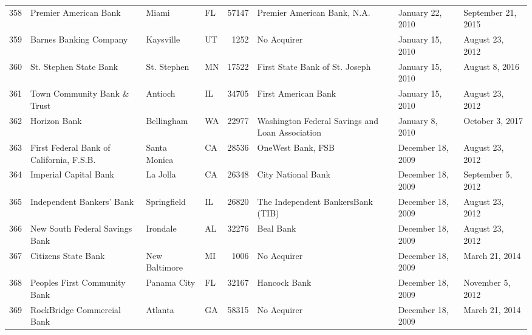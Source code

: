 \begin{tabular}{llllrlll}
358 &                              Premier American Bank &               Miami &  FL &  57147 &                        Premier American Bank, N.A. &    January 22, 2010 &  September 21, 2015 \\
359 &                             Barnes Banking Company &           Kaysville &  UT &   1252 &                                        No Acquirer &    January 15, 2010 &     August 23, 2012 \\
360 &                             St. Stephen State Bank &         St. Stephen &  MN &  17522 &                     First State Bank of St. Joseph &    January 15, 2010 &      August 8, 2016 \\
361 &                        Town Community Bank \& Trust &             Antioch &  IL &  34705 &                                First American Bank &    January 15, 2010 &     August 23, 2012 \\
362 &                                       Horizon Bank &          Bellingham &  WA &  22977 &    Washington Federal Savings and Loan Association &     January 8, 2010 &     October 3, 2017 \\
363 &           First Federal Bank of California, F.S.B. &        Santa Monica &  CA &  28536 &                                  OneWest Bank, FSB &   December 18, 2009 &     August 23, 2012 \\
364 &                              Imperial Capital Bank &            La Jolla &  CA &  26348 &                                 City National Bank &   December 18, 2009 &   September 5, 2012 \\
365 &                          Independent Bankers' Bank &         Springfield &  IL &  26820 &                  The Independent BankersBank (TIB) &   December 18, 2009 &     August 23, 2012 \\
366 &                     New South Federal Savings Bank &            Irondale &  AL &  32276 &                                          Beal Bank &   December 18, 2009 &     August 23, 2012 \\
367 &                                Citizens State Bank &       New Baltimore &  MI &   1006 &                                        No Acquirer &   December 18, 2009 &      March 21, 2014 \\
368 &                       Peoples First Community Bank &         Panama City &  FL &  32167 &                                       Hancock Bank &   December 18, 2009 &    November 5, 2012 \\
369 &                         RockBridge Commercial Bank &             Atlanta &  GA &  58315 &                                        No Acquirer &   December 18, 2009 &      March 21, 2014 \\

\end{tabular}

